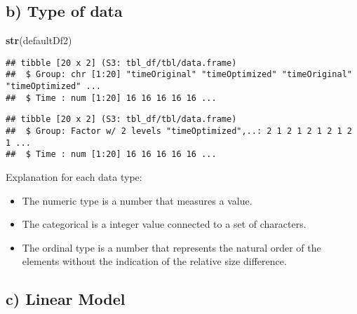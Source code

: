 \documentclass[
]{article}
\newenvironment{Shaded}{\begin{snugshade}}{\end{snugshade}}
\newcommand{\KeywordTok}[1]{\textcolor[rgb]{0.13,0.29,0.53}{\textbf{#1}}}
\newcommand{\NormalTok}[1]{#1}
\newcommand{\OperatorTok}[1]{\textcolor[rgb]{0.81,0.36,0.00}{\textbf{#1}}}
\newcommand{\StringTok}[1]{\textcolor[rgb]{0.31,0.60,0.02}{#1}}
\providecommand{\tightlist}{%
  \setlength{\itemsep}{0pt}\setlength{\parskip}{0pt}}
\begin{document}
\hypertarget{b-type-of-data}{%
\subsection{b) Type of data}\label{b-type-of-data}}

\begin{Shaded}
\begin{Highlighting}[]
\KeywordTok{str}\NormalTok{(defaultDf2)}
\end{Highlighting}
\end{Shaded}

\begin{verbatim}
## tibble [20 x 2] (S3: tbl_df/tbl/data.frame)
##  $ Group: chr [1:20] "timeOriginal" "timeOptimized" "timeOriginal" "timeOptimized" ...
##  $ Time : num [1:20] 16 16 16 16 16 ...
\end{verbatim}

\begin{Shaded}
\end{Shaded}

\begin{verbatim}
## tibble [20 x 2] (S3: tbl_df/tbl/data.frame)
##  $ Group: Factor w/ 2 levels "timeOptimized",..: 2 1 2 1 2 1 2 1 2 1 ...
##  $ Time : num [1:20] 16 16 16 16 16 ...
\end{verbatim}

Explanation for each data type:

\begin{itemize}
\tightlist
\item
  The numeric type is a number that measures a value.
\item
  The categorical is a integer value connected to a set of characters.
\item
  The ordinal type is a number that represents the natural order of the
  elements without the indication of the relative size difference.
\end{itemize}

\hypertarget{c-linear-model}{%
\subsection{c) Linear Model}\label{c-linear-model}}
\end{document}
